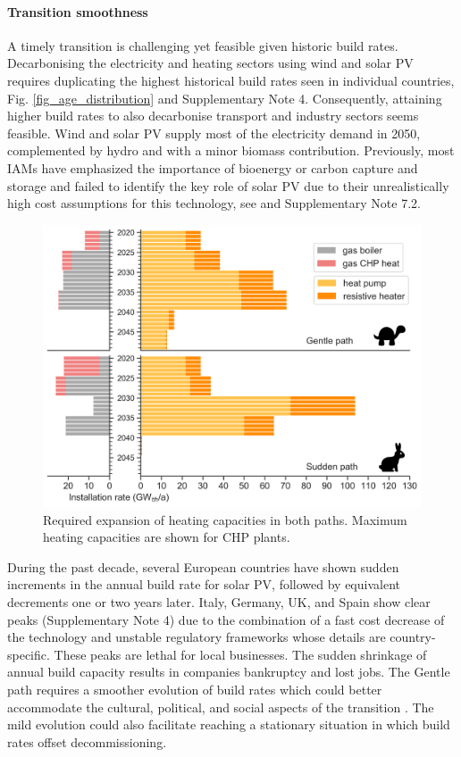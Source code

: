 \documentclass[5p]{elsarticle} %
\begin{document}
\paragraph{\textbf{Transition smoothness}} A timely transition is challenging yet feasible given historic build rates. Decarbonising the electricity and heating sectors using wind and solar PV requires 
duplicating the highest historical build rates seen in individual countries, Fig. \ref{fig_age_distribution} and Supplementary Note 4. Consequently, attaining higher build rates to also decarbonise transport and industry sectors seems feasible. Wind and solar PV supply most of the electricity demand in 2050, complemented by hydro and with a minor biomass contribution. Previously, most IAMs have emphasized the importance of bioenergy or carbon capture and storage and failed to identify the key role of solar PV due to their unrealistically high cost assumptions for this technology, see \cite{Creutzig_2017, Krey_2019} and Supplementary Note 7.2. \\

\begin{figure}[!h]
\centering
\includegraphics[width=\columnwidth]{../figures/heating_expansion_Base.png}
\caption{Required expansion of heating capacities in both paths. Maximum heating capacities are shown for CHP plants.} \label{fig_heating_expansion} 
\end{figure}

During the past decade, several European countries have shown sudden increments in the annual build rate for solar PV, followed by equivalent decrements one or two years later. Italy, Germany, UK, and Spain show clear peaks (Supplementary Note 4)  due to the combination of a fast cost decrease of the technology and unstable regulatory frameworks whose details are country-specific. These peaks are lethal for local businesses. The sudden shrinkage of annual build capacity results in companies bankruptcy and lost jobs. The Gentle path requires a smoother evolution of build rates which could better accommodate the cultural, political, and social aspects of the transition \cite{Geels_2017}. The mild evolution could also facilitate reaching a stationary situation in which build rates offset decommissioning. \\ 
\end{document}
